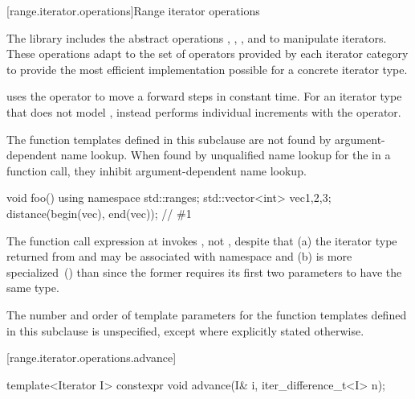 \begin{addedblock}
[range.iterator.operations]{Range iterator operations}

\pnum
The library includes the abstract operations
, ,
, and 
to manipulate iterators. These operations adapt to the set of operators
provided by each iterator category to provide the most efficient implementation
possible for a concrete iterator type.
\begin{example}
 uses the \tcode{+} operator to move a
 forward  steps in constant time.
For an iterator type that does not model ,
 instead performs  individual increments with
the \tcode{++} operator.
\end{example}

\pnum
The function templates defined in this subclause are not found by
argument-dependent name lookup. When found by
unqualified name lookup for the
 in a function call, they
inhibit argument-dependent name lookup.

\begin{example}
\begin{codeblock}
void foo() {
    using namespace std::ranges;
    std::vector<int> vec{1,2,3};
    distance(begin(vec), end(vec)); // \#1
}
\end{codeblock}
The function call expression at  invokes ,
not , despite that
(a) the iterator type returned from  and 
may be associated with namespace  and
(b)  is more specialized~() than
 since the former requires its first two parameters
to have the same type.
\end{example}

\pnum
The number and order of template parameters for the function templates defined
in this subclause is unspecified, except where explicitly stated otherwise.

[range.iterator.operations.advance]{}
%
\begin{itemdecl}
template<Iterator I>
  constexpr void advance(I& i, iter_difference_t<I> n);
\end{itemdecl}


\end{addedblock}
